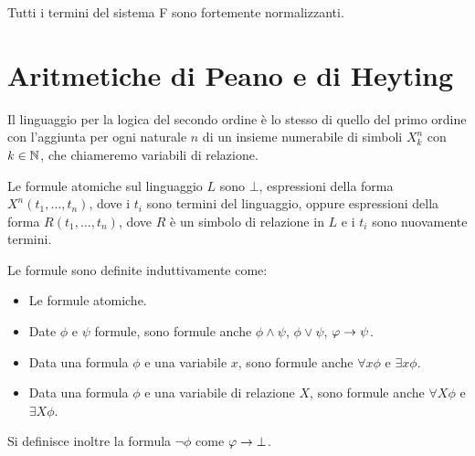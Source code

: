 \documentclass[]{marticle}
\begin{document}
\begin{block} [Teorema]
    Tutti i termini del sistema F sono fortemente normalizzanti.
\end{block}


\section{Aritmetiche di Peano e di Heyting}

\begin{block}[Definizione]
    Il linguaggio per la logica del secondo ordine \`e lo stesso di quello del
    primo ordine con l'aggiunta per ogni naturale $n$ di un insieme numerabile
    di simboli $X_k^n$ con $k\in\mathbb{N}$, che chiameremo variabili di relazione.  
    
    Le formule atomiche sul linguaggio $L$ sono $\bot$, espressioni della forma
    $X^n(t_1, \dots, t_n)$, dove i $t_i$ sono termini del linguaggio, oppure
    espressioni della forma $R(t_1, \dots, t_n)$, dove $R$ \`e un simbolo di
    relazione in $L$ e i $t_i$ sono nuovamente termini.

    Le formule sono definite induttivamente come:
    \begin{itemize}
        \item Le formule atomiche.
        \item Date $\phi$ e $\psi$ formule, sono formule anche $\phi \land
            \psi$, $\phi \lor \psi$, $\varphi \rightarrow \psi$.
        \item Data una formula $\phi$ e una variabile $x$, sono formule anche
            $\forall x \phi$ e $\exists x \phi$.
        \item Data una formula $\phi$ e una variabile di relazione $X$, sono
            formule anche $\forall X \phi$ e $\exists X \phi$.
    \end{itemize}
    Si definisce inoltre la formula $\lnot \phi$ come $\varphi \rightarrow \bot$.
\end{block} 
\end{document}
